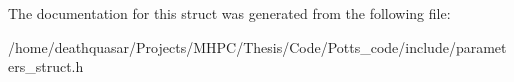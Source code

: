 The documentation for this struct was generated from the following file\+:\begin{DoxyCompactItemize}
\item 
/home/deathquasar/\+Projects/\+M\+H\+P\+C/\+Thesis/\+Code/\+Potts\+\_\+code/include/parameters\+\_\+struct.\+h\end{DoxyCompactItemize}
